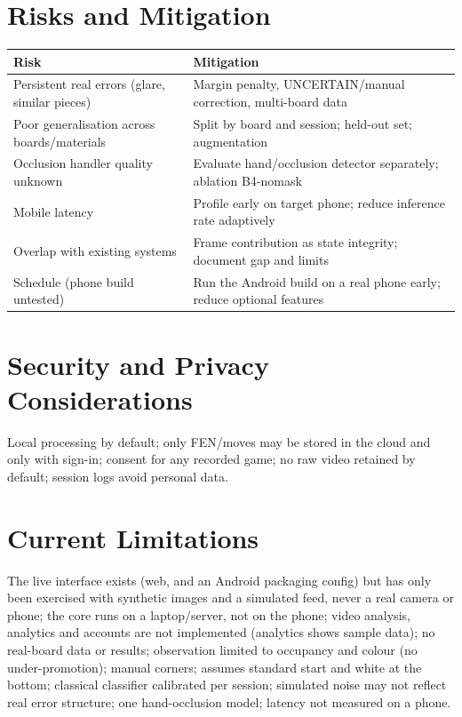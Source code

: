 \section{Risks and Mitigation}
\begin{longtable}{p{}p{}}
\toprule Risk & Mitigation\\ \midrule
Persistent real errors (glare, similar pieces) & Margin penalty, UNCERTAIN/manual correction, multi-board data\\
Poor generalisation across boards/materials & Split by board and session; held-out set; augmentation\\
Occlusion handler quality unknown & Evaluate hand/occlusion detector separately; ablation B4-nomask\\
Mobile latency & Profile early on target phone; reduce inference rate adaptively\\
Overlap with existing systems & Frame contribution as state integrity; document gap and limits\\
Schedule (phone build untested) & Run the Android build on a real phone early; reduce optional features\\
\bottomrule
\end{longtable}
\section{Security and Privacy Considerations}
Local processing by default; only FEN/moves may be stored in the cloud and only with sign-in; consent for any
recorded game; no raw video retained by default; session logs avoid personal data.
\section{Current Limitations}\label{sec:limits}
The live interface exists (web, and an Android packaging config) but has only been exercised with synthetic images and a
simulated feed, never a real camera or phone; the core runs on a laptop/server, not on the phone; video analysis, analytics and
accounts are not implemented (analytics shows sample data); no real-board data or results; observation limited to occupancy and colour (no
under-promotion); manual corners; assumes standard start and white at the bottom; classical classifier calibrated
per session; simulated noise may not reflect real error structure; one hand-occlusion model; latency not measured on a phone.
